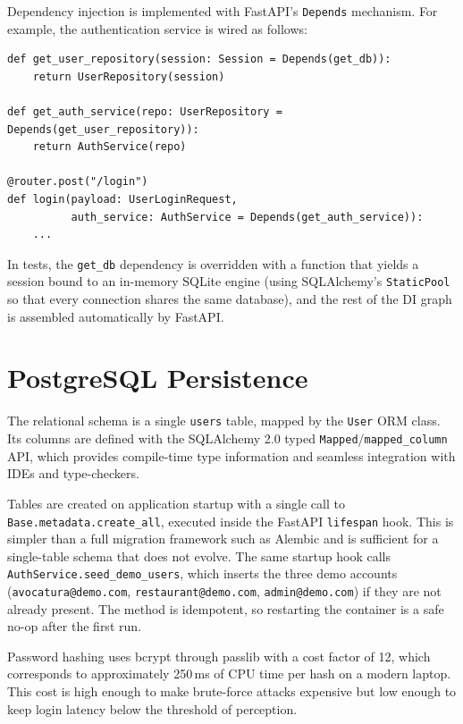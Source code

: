 Dependency injection is implemented with FastAPI's \texttt{Depends}
mechanism. For example, the authentication service is wired as follows:

\begin{verbatim}
def get_user_repository(session: Session = Depends(get_db)):
    return UserRepository(session)

def get_auth_service(repo: UserRepository = Depends(get_user_repository)):
    return AuthService(repo)

@router.post("/login")
def login(payload: UserLoginRequest,
          auth_service: AuthService = Depends(get_auth_service)):
    ...
\end{verbatim}

In tests, the \texttt{get\_db} dependency is overridden with a function
that yields a session bound to an in-memory SQLite engine (using
SQLAlchemy's \texttt{StaticPool} so that every connection shares the same
database), and the rest of the DI graph is assembled automatically by
FastAPI.

\section{PostgreSQL Persistence}
\label{sec:postgres-impl}

The relational schema is a single \texttt{users} table, mapped by the
\texttt{User} ORM class. Its columns are defined with the SQLAlchemy 2.0
typed \texttt{Mapped}/\texttt{mapped\_column} API, which provides
compile-time type information and seamless integration with IDEs and
type-checkers.

Tables are created on application startup with a single call to
\texttt{Base.metadata.create\_all}, executed inside the FastAPI
\texttt{lifespan} hook. This is simpler than a full migration framework
such as Alembic and is sufficient for a single-table schema that does not
evolve. The same startup hook calls
\texttt{AuthService.seed\_demo\_users}, which inserts the three demo
accounts (\texttt{avocatura@demo.com}, \texttt{restaurant@demo.com},
\texttt{admin@demo.com}) if they are not already present. The method is
idempotent, so restarting the container is a safe no-op after the first
run.

Password hashing uses bcrypt through passlib with a cost factor of 12,
which corresponds to approximately 250\,ms of CPU time per hash on a
modern laptop. This cost is high enough to make brute-force attacks
expensive but low enough to keep login latency below the threshold of
perception.

